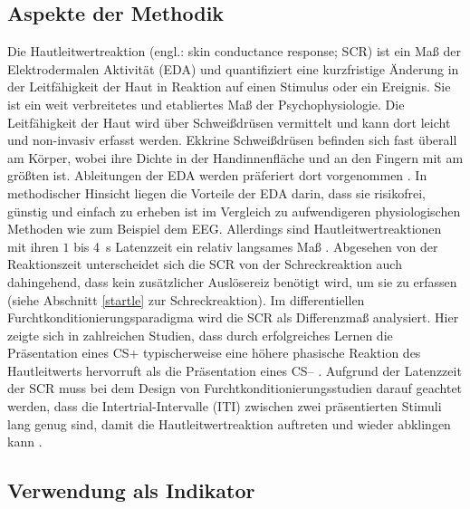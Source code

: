 	\subsection{Aspekte der Methodik}	\label{scrmethods}

		Die Hautleitwertreaktion (engl.: skin conductance response; SCR) ist ein Maß der Elektrodermalen Aktivität (EDA) und quantifiziert eine kurzfristige Änderung in der Leitfähigkeit der Haut in Reaktion auf einen Stimulus oder ein Ereignis. Sie ist ein weit verbreitetes und etabliertes Maß der Psychophysiologie. 
		Die Leitfähigkeit der Haut wird über Schweißdrüsen vermittelt und kann dort leicht und non-invasiv erfasst werden. Ekkrine Schweißdrüsen befinden sich fast überall am Körper, wobei ihre Dichte in der Handinnenfläche und an den Fingern mit am größten ist. Ableitungen der EDA werden präferiert dort vorgenommen \parencite{BOUCSEIN2012, DAWSON2007b}. In methodischer Hinsicht liegen die Vorteile der EDA darin, dass sie risikofrei, günstig und einfach zu erheben ist im Vergleich zu aufwendigeren physiologischen Methoden wie zum Beispiel dem EEG. Allerdings sind Hautleitwertreaktionen mit ihren $1$ bis \SI{4}{\second} Latenzzeit ein relativ langsames Maß \parencite{BOUCSEIN2012, DAWSON2007b}. Abgesehen von der Reaktionszeit unterscheidet sich die SCR von der Schreckreaktion auch dahingehend, dass kein zusätzlicher Auslösereiz benötigt wird, um sie zu erfassen (siehe Abschnitt \ref{startle} zur Schreckreaktion). 
		Im differentiellen Furchtkonditionierungsparadigma wird die SCR als Differenzmaß analysiert. Hier zeigte sich in zahlreichen Studien, dass durch erfolgreiches Lernen die Präsentation eines CS+ typischerweise eine höhere phasische Reaktion des Hautleitwerts hervorruft als die Präsentation eines CS-- \parencite{DAWSON1973, SEVENSTER2014}.
		Aufgrund der Latenzzeit der SCR muss bei dem Design von Furchtkonditionierungsstudien darauf geachtet werden, dass die Intertrial-Intervalle (ITI) zwischen zwei präsentierten Stimuli lang genug sind, damit die Hautleitwertreaktion auftreten und wieder abklingen kann \parencite{LONSDORF2017fc}.
		
		
	\subsection{Verwendung als Indikator}		\label{scrinference}
		
